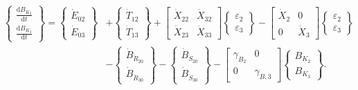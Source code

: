\begin{equation} \label{eq:C-Expanded_Matrix_Form}
	\begin{split}
		\begin{Bmatrix}
			\frac{\mathrm{d}B_{K_{2}}}{\mathrm{d}t} \\[0.4em] %
			\frac{\mathrm{d}B_{K_{3}}}{\mathrm{d}t} 
		\end{Bmatrix}
		=
		\begin{Bmatrix}
			\dot{E}_{02}\\
			\dot{E}_{03}
		\end{Bmatrix}
		& +                                               %
		\begin{Bmatrix}
			\dot{T}_{12}\\
			\dot{T}_{13}
		\end{Bmatrix}
		+
		\begin{bmatrix}
			\dot{X}_{22} & \dot{X}_{32}\\
			\dot{X}_{23} & \dot{X}_{33}
		\end{bmatrix}
		\begin{Bmatrix}
			\varepsilon_{2}\\
			\varepsilon_{3}
		\end{Bmatrix}   
		- 
		\begin{bmatrix}
			\dot{X}_{2} & 0          \\
			0           & \dot{X}_{3}
		\end{bmatrix}
		\begin{Bmatrix}
			\varepsilon_{2}\\
			\varepsilon_{3}
		\end{Bmatrix} \\                                 %
		& -                                              %
		\begin{Bmatrix}
			\dot{B}_{\dot{R}_{20}}  \\
			\dot{B}_{\dot{R}_{30}} 
		\end{Bmatrix}
		-
		\begin{Bmatrix}
			\dot{B}_{\dot{S}_{20}}  \\
			\dot{B}_{\dot{S}_{30}} 
		\end{Bmatrix}
		-
		\begin{bmatrix}
			\gamma_{B_{2}} & 0          \\
			0            & \gamma_{B,3}
		\end{bmatrix}
		\begin{Bmatrix}
			B_{K_{2}}\\
			B_{K_{3}}
		\end{Bmatrix}.
	\end{split}
\end{equation}

